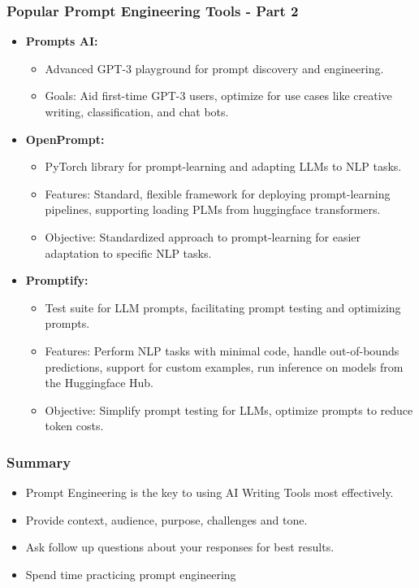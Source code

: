 \begin{frame}[fragile]\frametitle{Popular Prompt Engineering Tools - Part 2}
  \begin{itemize}
    \item \textbf{Prompts AI:}
      \begin{itemize}
        \item Advanced GPT-3 playground for prompt discovery and engineering.
        \item Goals: Aid first-time GPT-3 users, optimize for use cases like creative writing, classification, and chat bots.
      \end{itemize}
    \item \textbf{OpenPrompt:}
      \begin{itemize}
        \item PyTorch library for prompt-learning and adapting LLMs to NLP tasks.
        \item Features: Standard, flexible framework for deploying prompt-learning pipelines, supporting loading PLMs from huggingface transformers.
        \item Objective: Standardized approach to prompt-learning for easier adaptation to specific NLP tasks.
      \end{itemize}
    \item \textbf{Promptify:}
      \begin{itemize}
        \item Test suite for LLM prompts, facilitating prompt testing and optimizing prompts.
        \item Features: Perform NLP tasks with minimal code, handle out-of-bounds predictions, support for custom examples, run inference on models from the Huggingface Hub.
        \item Objective: Simplify prompt testing for LLMs, optimize prompts to reduce token costs.
      \end{itemize}
  \end{itemize}
\end{frame}


\begin{frame}[fragile]\frametitle{Summary}

\begin{itemize}
\item Prompt Engineering is the key to using AI Writing Tools most
effectively.
\item Provide context, audience, purpose, challenges and tone.
\item Ask follow up questions about your responses for best results.
\item Spend time practicing prompt engineering
\end{itemize}	 

\end{frame}